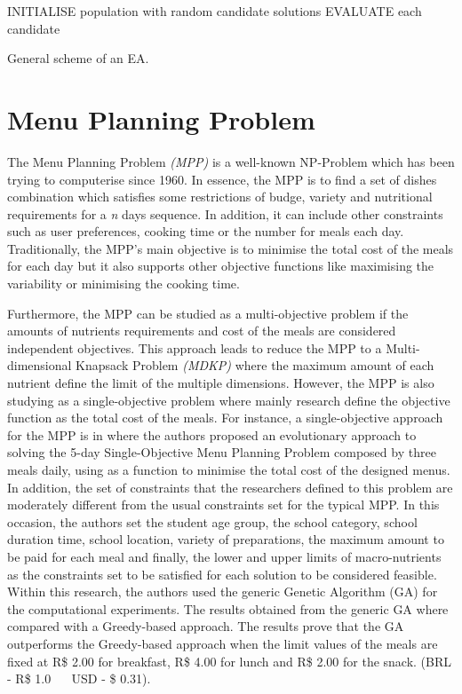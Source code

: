 \begin{algorithm}[!h]
  INITIALISE population with random candidate solutions\;
  EVALUATE each candidate\;
  \caption{General scheme of an EA.}
\end{algorithm}

\newpage
\section{Menu Planning Problem}

The Menu Planning Problem \textit{(MPP)} is a well-known NP-Problem which has been trying to computerise since 1960\cite{Ngo2016}. In essence, the MPP is to find a set of dishes combination which satisfies some restrictions of budge, variety and nutritional requirements for a \textit{n} days sequence. In addition, it can include other constraints such as user preferences, cooking time or the number for meals each day.
Traditionally, the MPP's main objective is to minimise the total cost of the meals for each day\cite{Ngo2016, Moreira2018} but it also supports other objective functions like maximising the variability or minimising the cooking time.

Furthermore, the MPP can be studied as a multi-objective problem\cite{Seljak2009, Moreira2018} if the amounts of nutrients requirements and cost of the meals are considered independent objectives. This approach leads to reduce the MPP to a Multi-dimensional Knapsack Problem \textit{(MDKP)} where the maximum amount of each nutrient define the limit of the multiple dimensions. However, the MPP is also studying as a single-objective problem where mainly research define the objective function as the total cost of the meals. For instance, a single-objective approach for the MPP is in\cite{Moreira2018} where the authors proposed an evolutionary approach to solving the 5-day Single-Objective Menu Planning Problem composed by three meals daily, using as a function to minimise the total cost of the designed menus. In addition, the set of constraints that the researchers defined to this problem are moderately different from the usual constraints set for the typical MPP. In this occasion, the authors set the student age group, the school category, school duration time, school location, variety of preparations, the maximum amount to be paid for each meal and finally, the lower and upper limits of macro-nutrients as the constraints set to be satisfied for each solution to be considered feasible. Within this research, the authors used the generic Genetic Algorithm (GA) for the computational experiments. The results obtained from the generic GA where compared with a Greedy-based approach. The results prove that the GA outperforms the Greedy-based approach when the limit values of the meals are fixed at R\$ 2.00 for breakfast, R\$ 4.00 for lunch and R\$ 2.00 for the snack. (BRL - R\$ 1.0 ~~ USD - \$ 0.31).

